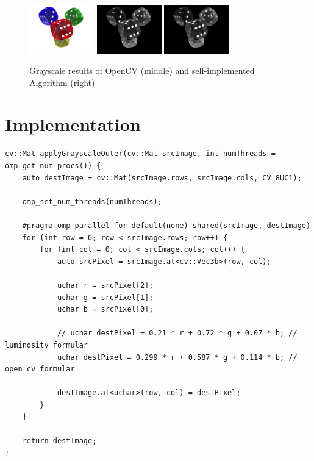     \begin{figure}[H]
        \centering

        \includegraphics[width=0.25\textwidth]{images/dice.png}
        \includegraphics[width=0.25\textwidth]{images/cv-grayscale.png}
        \includegraphics[width=0.25\textwidth]{images/own-grayscale.png}
        
        \caption{Grayscale results of OpenCV (middle) and self-implemented  Algorithm (right)}
        \label{fig:grayscale}
    \end{figure}


    \section{Implementation}

    

    \begin{listing}[H]
        \begin{verbatim}
cv::Mat applyGrayscaleOuter(cv::Mat srcImage, int numThreads = omp_get_num_procs()) {
    auto destImage = cv::Mat(srcImage.rows, srcImage.cols, CV_8UC1);

    omp_set_num_threads(numThreads);

    #pragma omp parallel for default(none) shared(srcImage, destImage)
    for (int row = 0; row < srcImage.rows; row++) {
        for (int col = 0; col < srcImage.cols; col++) {
            auto srcPixel = srcImage.at<cv::Vec3b>(row, col);

            uchar r = srcPixel[2];
            uchar g = srcPixel[1];
            uchar b = srcPixel[0];

            // uchar destPixel = 0.21 * r + 0.72 * g + 0.07 * b; // luminosity formular
            uchar destPixel = 0.299 * r + 0.587 * g + 0.114 * b; // open cv formular

            destImage.at<uchar>(row, col) = destPixel;
        }
    }

    return destImage;
}
        \end{verbatim}
        \label{listing:grayscale}
    \end{listing}


